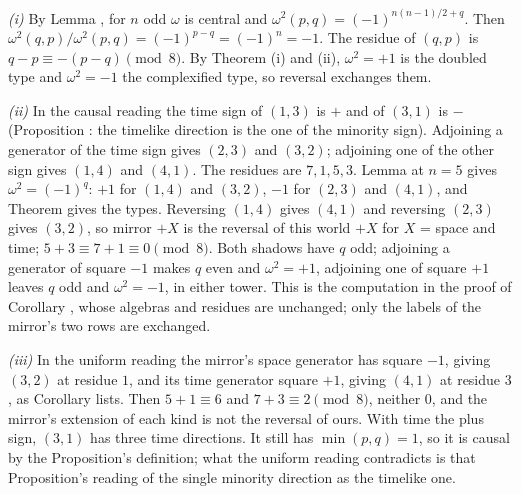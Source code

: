 \emph{(i)} By Lemma , for $n$ odd $\omega$ is central and $\omega^{2}(p,q) = (-1)^{n(n-1)/2 + q}$. Then $\omega^{2}(q,p)/\omega^{2}(p,q) = (-1)^{p - q} = (-1)^{n} = -1$. The residue of $(q,p)$ is $q - p \equiv -(p - q) \pmod 8$. By Theorem (i) and (ii), $\omega^{2} = +1$ is the doubled type and $\omega^{2} = -1$ the complexified type, so reversal exchanges them.

\emph{(ii)} In the causal reading the time sign of $(1,3)$ is $+$ and of $(3,1)$ is $-$ (Proposition : the timelike direction is the one of the minority sign). Adjoining a generator of the time sign gives $(2,3)$ and $(3,2)$; adjoining one of the other sign gives $(1,4)$ and $(4,1)$. The residues are $7, 1, 5, 3$. Lemma  at $n = 5$ gives $\omega^{2} = (-1)^{q}$: $+1$ for $(1,4)$ and $(3,2)$, $-1$ for $(2,3)$ and $(4,1)$, and Theorem  gives the types. Reversing $(1,4)$ gives $(4,1)$ and reversing $(2,3)$ gives $(3,2)$, so mirror $+ X$ is the reversal of this world $+ X$ for $X$ = space and time; $5 + 3 \equiv 7 + 1 \equiv 0 \pmod 8$. Both shadows have $q$ odd; adjoining a generator of square $-1$ makes $q$ even and $\omega^{2} = +1$, adjoining one of square $+1$ leaves $q$ odd and $\omega^{2} = -1$, in either tower. This is the computation in the proof of Corollary , whose algebras and residues are unchanged; only the labels of the mirror's two rows are exchanged.

\emph{(iii)} In the uniform reading the mirror's space generator has square $-1$, giving $(3,2)$ at residue $1$, and its time generator square $+1$, giving $(4,1)$ at residue $3$, as Corollary  lists. Then $5 + 1 \equiv 6$ and $7 + 3 \equiv 2 \pmod 8$, neither $0$, and the mirror's extension of each kind is not the reversal of ours. With time the plus sign, $(3,1)$ has three time directions. It still has $\min(p,q) = 1$, so it is causal by the Proposition's definition; what the uniform reading contradicts is that Proposition's reading of the single minority direction as the timelike one.

